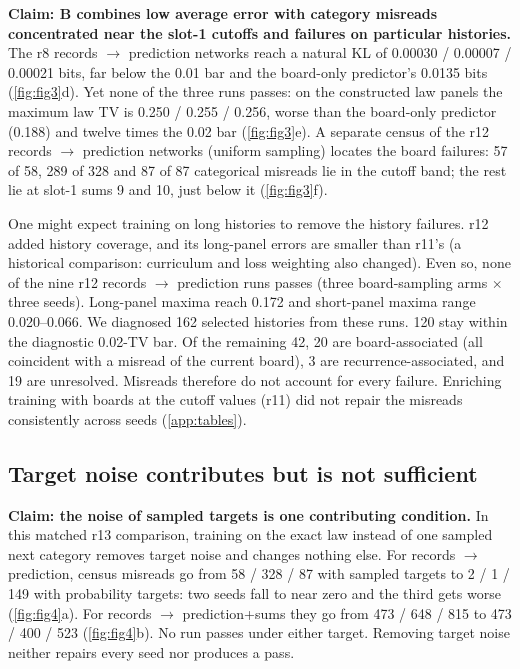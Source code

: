 \textbf{Claim: B combines low average error with category misreads
concentrated near the slot-1 cutoffs and failures on particular histories.}
The r8 records $\to$ prediction networks reach a natural KL of
0.00030 / 0.00007 / 0.00021 bits, far below the 0.01 bar and the board-only
predictor's 0.0135 bits (\cref{fig:fig3}d). Yet none of the three runs
passes: on the constructed law panels the maximum law TV is
0.250 / 0.255 / 0.256, worse than the board-only predictor (0.188) and
twelve times the 0.02 bar (\cref{fig:fig3}e). A separate census of the r12 records $\to$ prediction networks (uniform
sampling) locates the board failures: 57 of 58, 289 of 328 and 87 of 87
categorical misreads lie in the cutoff band; the rest lie at slot-1 sums 9
and 10, just below it (\cref{fig:fig3}f).

One might expect training on long histories to remove the history
failures. r12 added history coverage, and its long-panel errors are smaller
than r11's (a historical comparison: curriculum and loss weighting also
changed). Even so, none of the nine
r12 records $\to$ prediction runs passes (three board-sampling arms $\times$
three seeds).
Long-panel maxima reach 0.172 and short-panel maxima range 0.020--0.066. We
diagnosed 162 selected histories from these runs. 120 stay within the
diagnostic 0.02-TV bar. Of the remaining 42, 20 are board-associated (all
coincident with a misread of the current board), 3 are
recurrence-associated, and 19 are unresolved. Misreads therefore do not
account for every failure.
Enriching training with boards at the cutoff values (r11) did not repair the
misreads consistently across seeds (\cref{app:tables}).

\subsection{Target noise contributes but is not sufficient}\label{sec:res-noise}


\textbf{Claim: the noise of sampled targets is one contributing condition.}
In this matched r13 comparison, training on the exact law instead of one
sampled next category removes target noise and changes nothing else. For records $\to$ prediction, census misreads
go from 58 / 328 / 87 with sampled targets to 2 / 1 / 149 with probability
targets: two seeds fall to near zero and the third gets worse
(\cref{fig:fig4}a). For records $\to$ prediction+sums they go from
473 / 648 / 815 to 473 / 400 / 523 (\cref{fig:fig4}b). No run passes under
either target. Removing target noise neither repairs every seed nor produces a pass.

